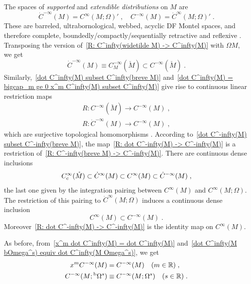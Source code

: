 \documentclass{memo-l}
\theoremstyle{plain}
\theoremstyle{definition}
\theoremstyle{remark}
\newcommand{\R}{\mathbb{R}}
\newcommand{\bOmega}{{}^{\text{\rm b}}\Omega}
\newcommand{\Cinftyc}{C^\infty_{\text{\rm c}}}
\numberwithin{section}{chapter}
\numberwithin{equation}{section}%
\begin{document}
The spaces of \emph{supported} and \emph{extendible distributions}   on $M$ are 
\[
\dot C^{-\infty}(M)=C^\infty(M;\Omega)'\;,\quad C^{-\infty}(M)=\dot C^\infty(M;\Omega)'\;.
\]
These are barreled, ultrabornological, webbed, acyclic DF Montel spaces, and therefore complete, boundedly/compactly/sequentially retractive and reflexive \cite[Proposition~6.1]{AlvKordyLeichtnam-conormal}. Transposing the version of~\eqref{R: C^infty(widetilde M) -> C^infty(M)} with $\Omega M$, we get \cite[Proposition~3.2.1]{Melrose1996}
\begin{equation}\label{dot C^-infty(M) subset C^-infty(breve M)}
\dot C^{-\infty}(M)\equiv C^{-\infty}_M(\breve M)\subset C^{-\infty}(\breve M)\;.
\end{equation}
Similarly,~\eqref{dot C^infty(M) subset C^infty(breve M)} and~\eqref{dot C^infty(M) = bigcap_m ge 0 x^m C^infty(M) subset C^infty(M)} give rise to continuous linear restriction maps
\begin{gather}
R:C^{-\infty}(\breve M)\to C^{-\infty}(M)\;,\label{R: C^-infty(breve M) -> C^-infty(M)}\\
R:\dot C^{-\infty}(M)\to C^{-\infty}(M)\;,\label{R: dot C^-infty(M) -> C^-infty(M)}
\end{gather}
which are surjective topological homomorphisms \cite[Proposition~6.2]{AlvKordyLeichtnam-conormal}. 
According to~\eqref{dot C^-infty(M) subset C^-infty(breve M)}, the map~\eqref{R: dot C^-infty(M) -> C^-infty(M)} is a restriction of~\eqref{R: C^-infty(breve M) -> C^-infty(M)}. There are continuous dense inclusions \cite[Lemma~3.2.1]{Melrose1996}
\begin{equation}\label{Cinftyc(mathring M) subset dot C^infty(M) subset C^infty(M) subset dot C^-infty(M)}
\Cinftyc(\mathring M)\subset\dot C^\infty(M)\subset C^\infty(M)\subset\dot C^{-\infty}(M)\;,
\end{equation}
the last one given by the integration pairing between $C^\infty(M)$ and $C^\infty(M;\Omega)$. The restriction of this pairing to $\dot C^\infty(M;\Omega)$ induces a continuous dense inclusion
\begin{equation}\label{C^infty(M) subset C^-infty(M)}
C^\infty(M)\subset C^{-\infty}(M)\;.
\end{equation}
Moreover~\eqref{R: dot C^-infty(M) -> C^-infty(M)} is the identity map on $C^\infty(M)$. 

As before, from~\eqref{x^m dot C^infty(M) = dot C^infty(M)} and~\eqref{dot C^infty(M bOmega^s) equiv dot C^infty(M Omega^s)}, we get
\begin{align}
x^mC^{-\infty}(M)&=C^{-\infty}(M)\quad(m\in\R)\;,\label{x^m C^-infty(M) = C^-infty(M)}\\
C^{-\infty}(M;\bOmega^s)&\equiv C^{-\infty}(M;\Omega^s)\quad(s\in\R)\;.\label{C^-infty(M bOmega^s) equiv C^-infty(M Omega^s)}
\end{align} 
\end{document}
